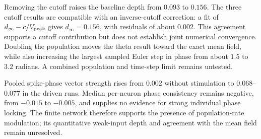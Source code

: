 Removing the cutoff raises the baseline depth from $0.093$ to $0.156$.
The three cutoff results are compatible with an inverse-cutoff correction:
a fit of $d_\infty-c/V_{\rm peak}$ gives $d_\infty=0.156$, with residuals
of about $0.002$. This agreement supports a cutoff contribution but does not
establish joint numerical convergence. Doubling the population moves the
theta result toward the exact mean field, while also increasing the largest
sampled Euler step in phase from about $1.5$ to $3.2$ radians. A combined
population and time-step limit remains untested.

Pooled spike-phase vector strength rises from $0.002$ without stimulation
to $0.068$--$0.077$ in the driven runs. Median per-neuron phase consistency
remains negative, from $-0.015$ to $-0.005$, and supplies no evidence for
strong individual phase locking. The finite network therefore supports the
presence of population-rate modulation; its quantitative weak-input depth
and agreement with the mean field remain unresolved.
